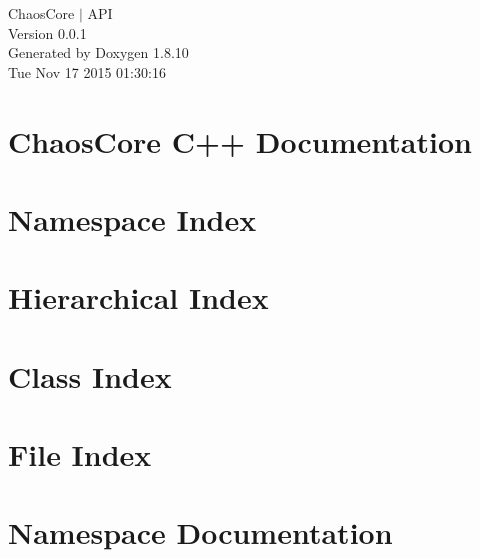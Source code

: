 \documentclass[twoside]{book}
\newcommand{\+}{\discretionary{\mbox{\scriptsize$\hookleftarrow$}}{}{}}
\newcommand{\clearemptydoublepage}{%
  \newpage{\pagestyle{empty}\cleardoublepage}%
}
\begin{document}
\hypersetup{pageanchor=false,
             bookmarks=true,
             bookmarksnumbered=true,
             pdfencoding=unicode
            }
\begin{titlepage}
\vspace*{7cm}
\begin{center}%
{\Large Chaos\+Core $\vert$ A\+P\+I \\[1ex]\large Version 0.\+0.\+1 }\\
\vspace*{1cm}
{\large Generated by Doxygen 1.8.10}\\
\vspace*{0.5cm}
{\small Tue Nov 17 2015 01:30:16}\\
\end{center}
\end{titlepage}
\clearemptydoublepage
\tableofcontents
\clearemptydoublepage
{}
\hypersetup{pageanchor=true}

\chapter{Chaos\+Core C++ Documentation}
\label{index}\hypertarget{index}{}
\chapter{Namespace Index}

\chapter{Hierarchical Index}

\chapter{Class Index}

\chapter{File Index}

\chapter{Namespace Documentation}












\end{document}
